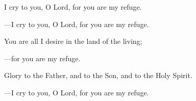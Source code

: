 \responsory
\begin{hangpar}

I cry to you, O Lord, for you are my refuge.

{\color{red}---\thinspace}I cry to you, O Lord, for you are my refuge.

\medskip You are all I desire in the land of the living;

{\color{red}---\thinspace}for you are my refuge.

\medskip Glory to the Father, and to the Son, and to the Holy Spirit.

{\color{red}---\thinspace}I cry to you, O Lord, for you are my refuge.
\end{hangpar}
